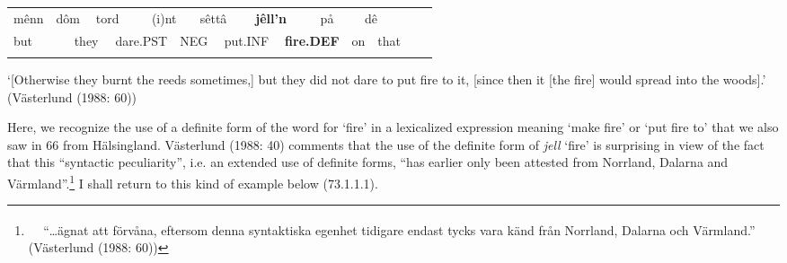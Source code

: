 \begin{tabular}{llllllllllllllllll}
\lsptoprule
mênn & \multicolumn{2}{l}{dôm

} & \multicolumn{2}{l}{tord

} & \multicolumn{2}{l}{(i)nt

} & \multicolumn{2}{l}{sêttâ

} & \multicolumn{2}{l}{{\bfseries jêll’n}

} & \multicolumn{2}{l}{på

} & \multicolumn{2}{l}{dê

} & \multicolumn{2}{l}{} & \\
\multicolumn{2}{l}{but

} & \multicolumn{2}{l}{they

} & \multicolumn{2}{l}{dare.PST

} & \multicolumn{2}{l}{NEG

} & \multicolumn{2}{l}{put.INF

} & \multicolumn{2}{l}{{\bfseries fire.DEF}

} & \multicolumn{2}{l}{on 

} & \multicolumn{2}{l}{that

} & \multicolumn{2}{l}{}\\
\lspbottomrule
\end{tabular}

\begin{styleExText}

\end{styleExText}

\begin{styleTranslation}
‘[Otherwise they burnt the reeds sometimes,] but they did not dare to put fire to it, [since then it [the fire] would spread into the woods].’ (Västerlund (1988: 60))

\end{styleTranslation}

\begin{styleBodyTextFirst}
Here, we recognize the use of a definite form of the word for ‘fire’ in a lexicalized expression meaning ‘make fire’ or ‘put fire to’ that we also saw in 66 from Hälsingland. Västerlund (1988: 40) comments that the use of the definite form of \textit{jell} ‘fire’ is surprising in view of the fact that this “syntactic peculiarity”, i.e. an extended use of definite forms, “has earlier only been attested from Norrland, Dalarna and Värmland”.\footnote{\textsuperscript{\ \ } “…ägnat att förvåna, eftersom denna syntaktiska egenhet tidigare endast tycks vara känd från Norrland, Dalarna och Värmland.” (Västerlund (1988: 60))}  I shall return to this kind of example below (73.1.1.1).

\end{styleBodyTextFirst}

